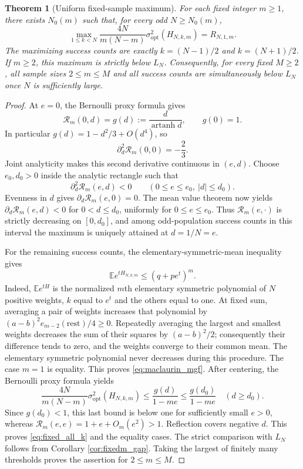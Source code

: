 \documentclass[11pt,a4paper]{article}
\newtheorem{theorem}{Theorem}[section]
\newcommand{\E}{\mathbb E}\newcommand{\R}{\mathbb R}\newcommand{\N}{\mathbb N}\newcommand{\one}{\mathbf1}
\begin{document}
\begin{theorem}[Uniform fixed-sample maximum]\label{thm:uniform_fixed}
For each fixed integer $m\ge1$, there exists $N_0(m)$ such that, for every odd $N\ge N_0(m)$,
\begin{equation}\label{eq:fixed_all_k}
 \max_{1\le k<N}\frac{4N}{m(N-m)}
 \sigma^2_{\mathrm{opt}}(H_{N,k,m})=R_{N,1,m}.
\end{equation}
The maximizing success counts are exactly $k=(N-1)/2$ and $k=(N+1)/2$. If $m\ge2$, this maximum is strictly below $L_N$. Consequently, for every fixed $M\ge2$, all sample sizes $2\le m\le M$ and all success counts are simultaneously below $L_N$ once $N$ is sufficiently large.
\end{theorem}
\begin{proof}
At $e=0$, the Bernoulli proxy formula gives
\[
 \mathcal R_m(0,d)=g(d):=\frac d{\operatorname{artanh}d},\qquad g(0)=1.
\]
In particular $g(d)=1-d^2/3+O(d^4)$, so
\[
 \partial_d^2\mathcal R_m(0,0)=-\frac23.
\]
Joint analyticity makes this second derivative continuous in $(e,d)$. Choose $e_0,d_0>0$ inside the analytic rectangle such that
\[
 \partial_d^2\mathcal R_m(e,d)<0
 \qquad (0\le e\le e_0,\ |d|\le d_0).
\]
Evenness in $d$ gives $\partial_d\mathcal R_m(e,0)=0$. The mean value theorem now yields $\partial_d\mathcal R_m(e,d)<0$ for $0<d\le d_0$, uniformly for $0\le e\le e_0$. Thus $\mathcal R_m(e,\cdot)$ is strictly decreasing on $[0,d_0]$, and among odd-population success counts in this interval the maximum is uniquely attained at $d=1/N=e$.

For the remaining success counts, the elementary-symmetric-mean inequality gives
\begin{equation}\label{eq:maclaurin_mgf}
 \E e^{tH_{N,k,m}}\le(q+pe^t)^m.
\end{equation}
Indeed, $\E e^{tH}$ is the normalized $m$th elementary symmetric polynomial of $N$ positive weights, $k$ equal to $e^t$ and the others equal to one. At fixed sum, averaging a pair of weights increases that polynomial by $(a-b)^2e_{m-2}(\mathrm{rest})/4\ge0$. Repeatedly averaging the largest and smallest weights decreases the sum of their squares by $(a-b)^2/2$; consequently their difference tends to zero, and the weights converge to their common mean. The elementary symmetric polynomial never decreases during this procedure. The case $m=1$ is equality. This proves \eqref{eq:maclaurin_mgf}. After centering, the Bernoulli proxy formula yields
\[
 \frac{4N}{m(N-m)}\sigma^2_{\mathrm{opt}}(H_{N,k,m})
 \le\frac{g(d)}{1-me}\le\frac{g(d_0)}{1-me}\quad(d\ge d_0).
\]
Since $g(d_0)<1$, this last bound is below one for sufficiently small $e>0$, whereas $\mathcal R_m(e,e)=1+e+O_m(e^2)>1$. Reflection covers negative $d$. This proves \eqref{eq:fixed_all_k} and the equality cases. The strict comparison with $L_N$ follows from Corollary \ref{cor:fixedm_gap}. Taking the largest of finitely many thresholds proves the assertion for $2\le m\le M$.
\end{proof}
\end{document}
